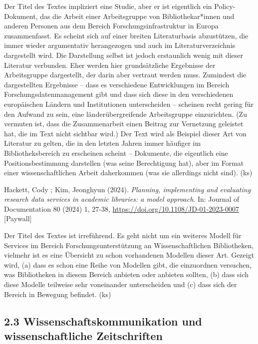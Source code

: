 \documentclass[a4paper,
fontsize=11pt,
oneside,
numbers=noperiodatend,
parskip=half-,
bibliography=totoc,
final
]{scrartcl}
\begin{document}
Der Titel des Textes impliziert eine Studie, aber er ist eigentlich ein
Policy-Dokument, das die Arbeit einer Arbeitsgruppe von
Bibliothekar*innen und anderen Personen aus dem Bereich
Forschungsinfrastruktur in Europa zusammenfasst. Es scheint sich auf
einer breiten Literaturbasis abzustützen, die immer wieder argumentativ
herangezogen und auch im Literaturverzeichnis dargestellt wird. Die
Darstellung selbst ist jedoch erstaunlich wenig mit dieser Literatur
verbunden. Eher werden hier grundsätzliche Ergebnisse der Arbeitsgruppe
dargestellt, der darin aber vertraut werden muss. Zumindest die
dargestellten Ergebnisse -- dass es verschiedene Entwicklungen im
Bereich Forschungsdatenmanagement gibt und dass sich diese in den
verschiedenen europäischen Ländern und Institutionen unterscheiden --
scheinen recht gering für den Aufwand zu sein, eine länderübergreifende
Arbeitsgruppe einzurichten. (Zu vermuten ist, dass die Zusammenarbeit
einen Beitrag zur Vernetzung geleistet hat, die im Text nicht sichtbar
wird.) Der Text wird als Beispiel dieser Art von Literatur zu gelten,
die in den letzten Jahren immer häufiger im Bibliotheksbereich zu
erscheinen scheint -- Dokumente, die eigentlich eine Positionsbestimmung
darstellen (was seine Berechtigung hat), aber im Format einer
wissenschaftlichen Arbeit daherkommen (was sie allerdings nicht sind).
(ks)

Hackett, Cody ; Kim, Jeonghyun (2024). \emph{Planning, implementing and
evaluating research data services in academic libraries: a model
approach}. In: Journal of Documentation 80 (2024) 1, 27-38,
\url{https://doi.org/10.1108/JD-01-2023-0007} {[}Paywall{]}

Der Titel des Textes ist irreführend. Es geht nicht um ein weiteres
Modell für Services im Bereich Forschungsunterstützung an
Wissenschaftlichen Bibliotheken, vielmehr ist es eine Übersicht zu schon
vorhandenen Modellen dieser Art. Gezeigt wird, (a) dass es schon eine
Reihe von Modellen gibt, die einzuordnen versuchen, was Bibliotheken in
diesem Bereich anbieten oder anbieten sollten, (b) dass sich diese
Modelle teilweise sehr voneinander unterscheiden und (c) dass sich der
Bereich in Bewegung befindet. (ks)

\hypertarget{wissenschaftskommunikation-und-wissenschaftliche-zeitschriften}{%
\subsection{2.3 Wissenschaftskommunikation und wissenschaftliche
Zeitschriften}\label{wissenschaftskommunikation-und-wissenschaftliche-zeitschriften}}
\end{document}
